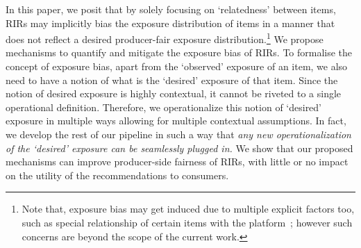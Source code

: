 In this paper, we posit that by solely focusing on `relatedness' between items, RIRs may implicitly bias the exposure distribution of items in a manner that does not reflect a desired producer-fair exposure distribution.\footnote{Note that, exposure bias may get induced due to multiple explicit factors too, such as special relationship of certain items with the platform~\cite{dash2021umpire}; however such concerns are beyond the scope of the current work.}
We propose mechanisms to quantify and mitigate the exposure bias of RIRs. To formalise the concept of exposure bias, apart from the `observed' exposure of an item, we also need to have a notion of what is the `desired' exposure of that item. 
Since the notion of desired exposure is highly contextual, it cannot be riveted to a single operational definition. Therefore, we operationalize this notion of `desired' exposure in multiple ways allowing for multiple contextual assumptions. In fact, we develop the rest of our pipeline in such a way that {\it any new operationalization of the `desired' exposure can be seamlessly plugged in.}
We show that our proposed mechanisms can improve producer-side fairness of RIRs, with little or no impact on the utility of the recommendations to consumers.


